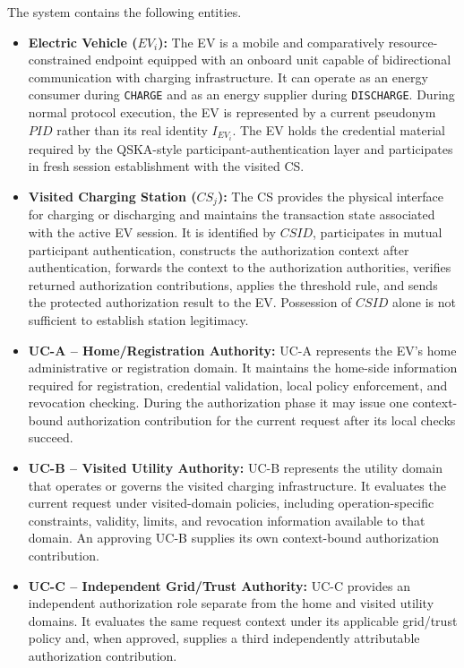 \documentclass[twocolumn,10pt,journal]{IEEEtran}
\begin{document}
The system contains the following entities.
\begin{itemize}[leftmargin=*]
    \item \textbf{Electric Vehicle ($EV_i$):} The EV is a mobile and comparatively resource-constrained endpoint equipped with an onboard unit capable of bidirectional communication with charging infrastructure. It can operate as an energy consumer during \texttt{CHARGE} and as an energy supplier during \texttt{DISCHARGE}. During normal protocol execution, the EV is represented by a current pseudonym $PID$ rather than its real identity $I_{EV_i}$. The EV holds the credential material required by the QSKA-style participant-authentication layer and participates in fresh session establishment with the visited CS.

    \item \textbf{Visited Charging Station ($CS_j$):} The CS provides the physical interface for charging or discharging and maintains the transaction state associated with the active EV session. It is identified by $CSID$, participates in mutual participant authentication, constructs the authorization context after authentication, forwards the context to the authorization authorities, verifies returned authorization contributions, applies the threshold rule, and sends the protected authorization result to the EV. Possession of $CSID$ alone is not sufficient to establish station legitimacy.

    \item \textbf{UC-A -- Home/Registration Authority:} UC-A represents the EV's home administrative or registration domain. It maintains the home-side information required for registration, credential validation, local policy enforcement, and revocation checking. During the authorization phase it may issue one context-bound authorization contribution for the current request after its local checks succeed.

    \item \textbf{UC-B -- Visited Utility Authority:} UC-B represents the utility domain that operates or governs the visited charging infrastructure. It evaluates the current request under visited-domain policies, including operation-specific constraints, validity, limits, and revocation information available to that domain. An approving UC-B supplies its own context-bound authorization contribution.

    \item \textbf{UC-C -- Independent Grid/Trust Authority:} UC-C provides an independent authorization role separate from the home and visited utility domains. It evaluates the same request context under its applicable grid/trust policy and, when approved, supplies a third independently attributable authorization contribution.
\end{itemize}
\end{document}
